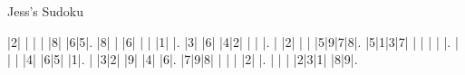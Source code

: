 Jess's Sudoku\vspace{0.2cm}

\begin{sudoku-block}|2| | | | |8| |6|5|.
|8| | |6| | | |1| |.
|3| |6| |4|2| | | |.
| |2| | | |5|9|7|8|.
|5|1|3|7| | | | | |.
| | | |4| |6|5| |1|.
| |3|2| |9| |4| |6|.
|7|9|8| | | | |2| |.
| | | |2|3|1| |8|9|.
\end{sudoku-block}